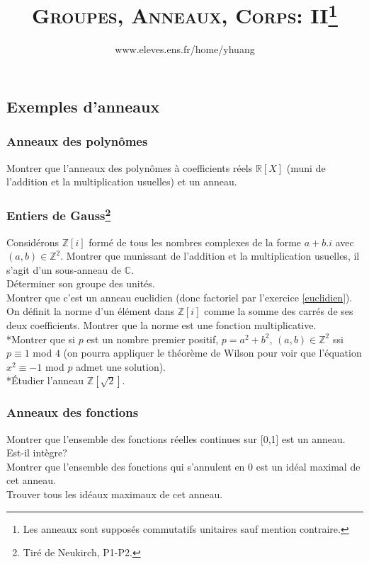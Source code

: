 \documentclass{article}
\begin{document}
\setcounter{section}{13}

\title{\textsc{Groupes, Anneaux, Corps: II}\protect\footnote{Les anneaux sont suppos\'es commutatifs unitaires sauf mention contraire.}}
\author{www.eleves.ens.fr/home/yhuang}
\date{}
\maketitle

\subsection{Exemples d'anneaux}
\subsubsection{Anneaux des polyn\^omes}
Montrer que l'anneaux des polyn\^omes \`a coefficients r\'eels $\mathbb{R}[X]$ (muni de l'addition et la multiplication usuelles) et un anneau.
\subsubsection{Entiers de Gauss\protect\footnote{Tir\'e de Neukirch, P1-P2.}}
Consid\'erons $\mathbb{Z}[i]$ form\'e de tous les nombres complexes de la forme $a+b.i$ avec $(a,b)\in\mathbb{Z}^2$. Montrer que munissant de l'addition et la multiplication usuelles, il s'agit d'un sous-anneau de $\mathbb{C}$.\\
D\'eterminer son groupe des unit\'es.\\
Montrer que c'est un anneau euclidien (donc factoriel par l'exercice \ref{euclidien}).\\
On d\'efinit la norme d'un \'el\'ement dans $\mathbb{Z}[i]$ comme la somme des carr\'es de ses deux coefficients. Montrer que la norme est une fonction multiplicative.\\
*Montrer que si $p$ est un nombre premier positif, $p=a^2+b^2$, $(a,b)\in\mathbb{Z}^2$ ssi $p\equiv 1$ mod $4$ (on pourra appliquer le th\'eor\`eme de Wilson pour voir que l'\'equation $x^2\equiv -1$ mod $p$ admet une solution).\\
*\'Etudier l'anneau $\mathbb{Z}[\sqrt{2}]$.
\subsubsection{Anneaux des fonctions}
Montrer que l'ensemble des fonctions r\'eelles continues sur [0,1] est un anneau. Est-il int\`egre?\\
Montrer que l'ensemble des fonctions qui s'annulent en $0$ est un id\'eal maximal de cet anneau.\\
Trouver tous les id\'eaux maximaux de cet anneau.
\end{document}
